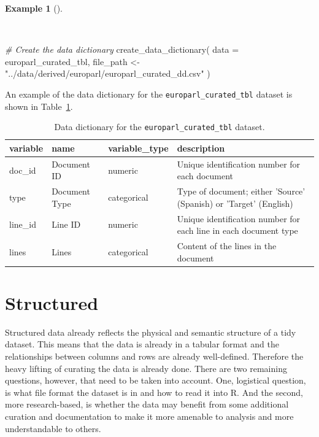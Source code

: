 \documentclass[
  letterpaper,
  DIV=11,
  numbers=noendperiod]{scrreport}
\newenvironment{Shaded}{\begin{snugshade}}{\end{snugshade}}
\newcommand{\AttributeTok}[1]{\textcolor[rgb]{0.00,0.00,0.00}{#1}}
\newcommand{\CommentTok}[1]{\textcolor[rgb]{0.00,0.00,0.00}{\textit{#1}}}
\newcommand{\FunctionTok}[1]{\textcolor[rgb]{0.00,0.00,0.00}{#1}}
\newcommand{\NormalTok}[1]{\textcolor[rgb]{0.00,0.00,0.00}{#1}}
\newcommand{\OtherTok}[1]{\textcolor[rgb]{0.00,0.00,0.00}{#1}}
\newcommand{\StringTok}[1]{\textcolor[rgb]{0.00,0.00,0.00}{#1}}
\theoremstyle{definition}
\newtheorem{example}{Example}[chapter]
\theoremstyle{remark}
\begin{document}
\begin{example}[]\protect\hypertarget{exm-cd-unstructured-data-dictionary}{}\label{exm-cd-unstructured-data-dictionary}

~

\begin{Shaded}
\begin{Highlighting}[]
\CommentTok{\# Create the data dictionary}
\FunctionTok{create\_data\_dictionary}\NormalTok{(}
  \AttributeTok{data =}\NormalTok{ europarl\_curated\_tbl,}
\NormalTok{  file\_path }\OtherTok{\textless{}{-}} \StringTok{"../data/derived/europarl/europarl\_curated\_dd.csv"}
\NormalTok{)}
\end{Highlighting}
\end{Shaded}

\end{example}

An example of the data dictionary for the
\texttt{europarl\_curated\_tbl} dataset is shown in
Table~\ref{tbl-cd-unstructured-data-dictionary-example}.

\hypertarget{tbl-cd-unstructured-data-dictionary-example}{}
\begin{table}
\caption{\label{tbl-cd-unstructured-data-dictionary-example}Data dictionary for the \texttt{europarl\_curated\_tbl} dataset. }\tabularnewline

\centering
\begin{tabular}{l|l|l|l}
\hline
variable & name & variable\_type & description\\
\hline
doc\_id & Document ID & numeric & Unique identification number for each document\\
\hline
type & Document Type & categorical & Type of document; either 'Source' (Spanish) or 'Target' (English)\\
\hline
line\_id & Line ID & numeric & Unique identification number for each line in each document type\\
\hline
lines & Lines & categorical & Content of the lines in the document\\
\hline
\end{tabular}
\end{table}

\hypertarget{structured}{%
\section{Structured}\label{structured}}

Structured data already reflects the physical and semantic structure of
a tidy dataset. This means that the data is already in a tabular format
and the relationships between columns and rows are already well-defined.
Therefore the heavy lifting of curating the data is already done. There
are two remaining questions, however, that need to be taken into
account. One, logistical question, is what file format the dataset is in
and how to read it into R. And the second, more research-based, is
whether the data may benefit from some additional curation and
documentation to make it more amenable to analysis and more
understandable to others.
\end{document}
